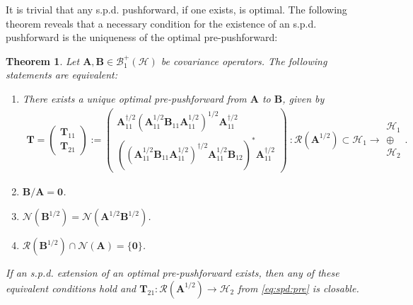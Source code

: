 \documentclass[noinfoline]{imsart}\setcounter{tocdepth}{2}
\newcommand{\m}[1]{\mathbf{#1}} %
\renewcommand{\c}[1]{\mathcal{#1}} %
\theoremstyle{plain}
\newtheorem{theorem}{Theorem}[section]
\begin{document}
It is trivial that any s.p.d. pushforward, if one exists, is optimal. The following theorem reveals that a necessary condition for the existence of an s.p.d. pushforward is the uniqueness of the optimal pre-pushforward:

\begin{theorem}\label{thm:spd:inf}
Let $\m{A}, \m{B} \in \c{B}_{1}^{+}(\c{H})$ be covariance operators. The following statements are equivalent:
\begin{enumerate}[leftmargin = *]
    \item There exists a unique optimal pre-pushforward from $\m{A}$ to $\m{B}$, given by
\begin{align}\label{eq:spd:pre}
    \m{T} = \begin{pmatrix}
    \m{T}_{11} \\
    \m{T}_{21}
    \end{pmatrix} :=
    \begin{pmatrix}
    \m{A}_{11}^{\dagger/2} (\m{A}_{11}^{1/2} \m{B}_{11} \m{A}_{11}^{1/2})^{1/2} \m{A}_{11}^{\dagger/2} \\
    ((\m{A}_{11}^{1/2} \m{B}_{11} \m{A}_{11}^{1/2})^{\dagger/2} \m{A}_{11}^{1/2} \m{B}_{12})^{*} \m{A}_{11}^{\dagger/2}
    \end{pmatrix}
    \    :
    \c{R}(\m{A}^{1/2}) \subset \c{H}_{1}
    \rightarrow
    \begin{array}{c}
    \c{H}_{1} \\
    \oplus \\
    \c{H}_{2}
    \end{array}.
\end{align}
    \item $\m{B}/\m{A} = \m{0}$.
    \item $\c{N} (\m{B}^{1/2}) = \c{N}(\m{A}^{1/2} \m{B}^{1/2})$.
    \item $ \c{R}(\m{B}^{1/2}) \cap \c{N}(\m{A}) = \{ \m{0} \}$.    
\end{enumerate}
If an s.p.d. extension of an optimal pre-pushforward exists, then any of these equivalent conditions hold and $\m{T}_{21}: \c{R}(\m{A}^{1/2}) \to \c{H}_{2}$ from \eqref{eq:spd:pre} is closable.
\end{theorem}
\end{document}
